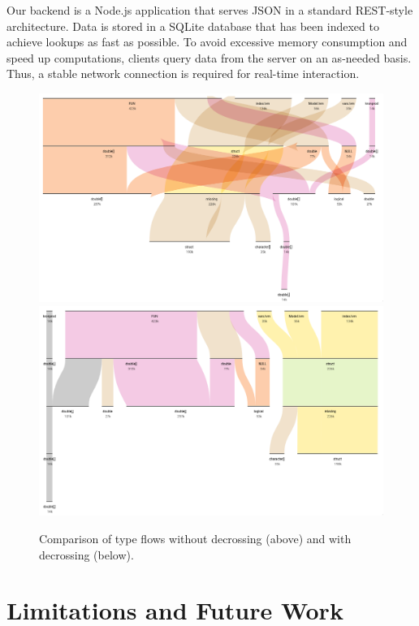 \documentclass{vgtc}                          %
\begin{document}
Our backend is a Node.js application that serves
JSON in a standard REST-style architecture.
Data is stored in a SQLite database that has been
indexed to achieve lookups as fast as possible.
To avoid excessive memory consumption and speed up computations,
clients query data from the server on an as-needed basis.
Thus, a stable network connection is required for
real-time interaction.

\begin{figure}[tb]
 \centering
 \includegraphics[width=\columnwidth]{img/no_decross.png}
 \includegraphics[width=\columnwidth]{img/decross.png}
 \caption{Comparison of type flows without decrossing (above) and with decrossing (below).}
 \label{fig:decross}
\end{figure}


\section{Limitations and Future Work}
\end{document}
